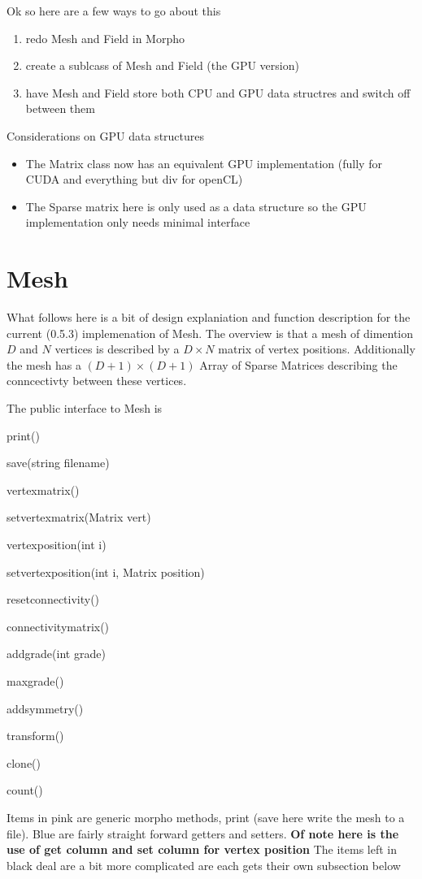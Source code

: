 \documentclass[]{article}
\title{}
\author{}
\begin{document}
\maketitle

Ok so here are a few ways to go about this
\begin{enumerate}
	\item redo Mesh and Field in Morpho
	\item create a sublcass of Mesh and Field (the GPU version)
	\item have Mesh and Field store both CPU and GPU data structres and switch off between them
\end{enumerate}
Considerations on GPU data structures
\begin{itemize}
	\item The Matrix class now has an equivalent GPU implementation (fully for CUDA and everything but div for openCL)
	\item The Sparse matrix here is only used as a data structure so the GPU implementation only needs minimal interface
\end{itemize}

\section{Mesh}
What follows here is a bit of design explaniation and function description for the current (0.5.3) implemenation of Mesh. The overview is that a mesh of dimention $D$ and $N$ vertices is described by a $D\times N$ matrix of vertex positions. Additionally the mesh has a $(D+1)\times(D+1)$ Array of Sparse Matrices describing the conncectivty between these vertices.

The public interface to Mesh is
\begin{itemize}
	\item {\color{magenta} print()
	\item save(string filename)}
	\item {\color{blue} vertexmatrix() 
	\item setvertexmatrix(Matrix vert)
	\item vertexposition(int i)
	\item setvertexposition(int i, Matrix position)
	\item resetconnectivity()}
	\item connectivitymatrix()
	\item addgrade(int grade)
	\item maxgrade()
	\item addsymmetry()
	\item transform()
	\item {\color{magenta} clone()
	\item count()}
\end{itemize}
Items in pink are generic morpho methods, print (save here write the mesh to a file). Blue are fairly straight forward getters and setters. {\bf Of note here is the use of get column and set column for vertex position}
The items left in black deal are a bit more complicated are each gets their own subsection below
\end{document}
